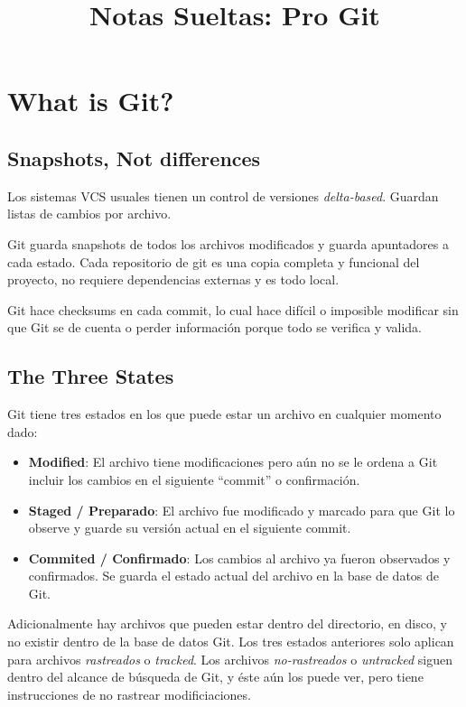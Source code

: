 \documentclass[spanish, 12pt, a4paper]{article}
\title{Notas Sueltas: Pro Git}
\begin{document}
\section{What is Git?}

\subsection{Snapshots, Not differences}

Los sistemas VCS usuales tienen un control de versiones
\emph{delta-based}. Guardan listas de cambios por archivo.

Git guarda snapshots de todos los archivos modificados y guarda
apuntadores a cada estado. Cada repositorio de git es una copia completa
y funcional del proyecto, no requiere dependencias externas y es todo
local.

Git hace checksums en cada commit, lo cual hace difícil o imposible
modificar sin que Git se de cuenta o perder información porque todo se
verifica y valida.

\subsection{The Three States}

Git tiene tres estados en los que puede estar un archivo en cualquier
momento dado:

\begin{itemize}
\item
  \textbf{Modified}: El archivo tiene modificaciones pero
  aún no se le ordena a Git incluir los cambios en el siguiente ``commit''
  o confirmación.
\item
  \textbf{Staged / Preparado}: El archivo fue modificado y marcado para
  que Git lo observe y guarde su versión actual en el siguiente commit.
\item
  \textbf{Commited / Confirmado}: Los cambios al archivo ya fueron
  observados y confirmados. Se guarda el estado actual del archivo en la
  base de datos de Git.
\end{itemize}

Adicionalmente hay archivos que pueden estar dentro del directorio, en
disco, y no existir dentro de la base de datos Git. Los tres estados
anteriores solo aplican para archivos \emph{rastreados} o
\emph{tracked}. Los archivos \emph{no-rastreados} o \emph{untracked}
siguen dentro del alcance de búsqueda de Git, y éste aún los puede ver,
pero tiene instrucciones de no rastrear modificiaciones.
\end{document}
